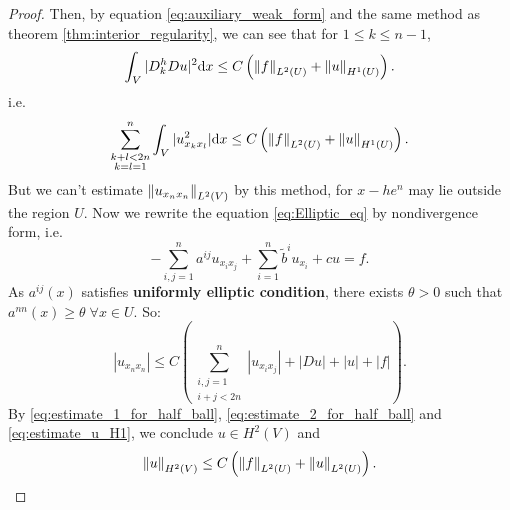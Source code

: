 \begin{proof}
    Then, by equation \eqref{eq:auxiliary_weak_form} and the same method as theorem \ref{thm:interior_regularity}, we can see that for $1\le k\le n-1$, 
    \begin{equation}
        \int_{V}|D_{k}^{h}Du|^{2}\mathrm{d} x\le C\left(\left\|f\right\|_{L^{2}(U)}+\left\|u\right\|_{H^{1}(U)}\right).
    \end{equation}
    i.e.
    \begin{equation}
        \label{eq:estimate_1_for_half_ball}
        \sum_{\substack{k+l<2n\\k=l=1}}^{n}\int_{V}|u_{x_{k}x_{l}}^{2}|\mathrm{d} x\le C\left(\left\|f\right\|_{L^{2}(U)}+\left\|u\right\|_{H^{1}(U)}\right).
    \end{equation}
    But we can't estimate $\left\|u_{x_{n}x_{n}}\right\|_{L^{2}(V)}$ by this method, for $x-he^{n}$ may lie outside the region $U$. Now we rewrite the equation \eqref{eq:Elliptic_eq} by nondivergence form, i.e.
    \begin{equation}
        -\sum_{i,j=1}^{n}a^{ij}u_{x_{i}x_{j}}+\sum_{i=1}^{n}\tilde{b}^{i}u_{x_{i}}+cu=f.
    \end{equation}
    As $a^{ij}(x)$ satisfies \textbf{uniformly elliptic condition}, there exists $\theta>0$ such that $a^{nn}(x)\ge \theta\;\forall x\in U$. So:
    \begin{equation}
        \label{eq:estimate_2_for_half_ball}
        |u_{x_{n}x_{n}}|\le C\left(\sum_{\substack{i,j=1\\i+j<2n}}^{n}|u_{x_{i}x_{j}}|+|Du|+|u|+|f|\right).
    \end{equation}
    By \eqref{eq:estimate_1_for_half_ball}, \eqref{eq:estimate_2_for_half_ball} and \eqref{eq:estimate_u_H1}, we conclude $u\in H^{2}(V)$ and 
    \begin{equation}
        \label{eq:estimate_on_half_ball}
        \left\|u\right\|_{H^{2}(V)}\le C\left(\left\|f\right\|_{L^{2}(U)}+\left\|u\right\|_{L^{2}(U)}\right).
    \end{equation}
\end{proof}